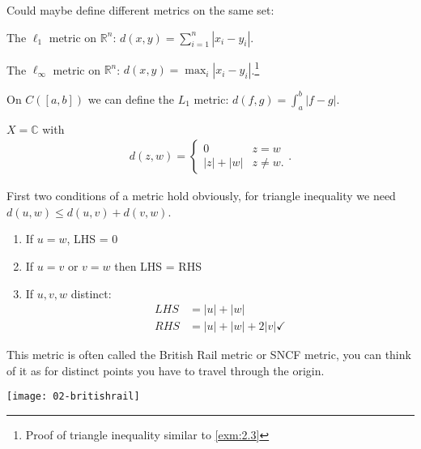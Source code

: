     Could maybe define different metrics on the same set:
    \begin{example}
        The $\ell_1$ metric on $\mathbb{R}^n$: $d(x, y) = \sum_{i=1}^{n} |x_i - y_i|$.
    \end{example} 

    \begin{example}
        The $\ell_\infty$ metric on $\mathbb{R}^n$: $d(x, y) = \max_{i} |x_i - y_i|$.\footnote{Proof of triangle inequality similar to \cref{exm:2.3}}
    \end{example} 

    \begin{example}
        On $C([a, b])$ we can define the $L_1$ metric: $d(f, g) = \int_a^b |f-g|$.
    \end{example} 

    \begin{example}
        $X = \mathbb{C}$ with 
        \begin{align*}
            d(z, w) = \begin{cases}
                0 & z = w \\
                |z| + |w| & z \neq w.
            \end{cases}.
        \end{align*}

        First two conditions of a metric hold obviously, for triangle inequality we need $d(u, w) \leq d(u, v) + d(v, w)$.

        \begin{enumerate}
            \item If $u = w$, LHS = 0 \checkmark
            \item If $u = v$ or $v = w$ then LHS = RHS \checkmark
            \item If $u, v, w$ distinct:
            \begin{align*}
                LHS &= |u| + |w| \\
                RHS &= |u| + |w| + 2|v| \checkmark
            \end{align*} 
        \end{enumerate} 

        This metric is often called the British Rail metric or SNCF metric, you can think of it as for distinct points you have to travel through the origin.
        {\par 
    \centering 
    \texttt{[image: 02-britishrail]} 
        \par}
    \end{example} 

